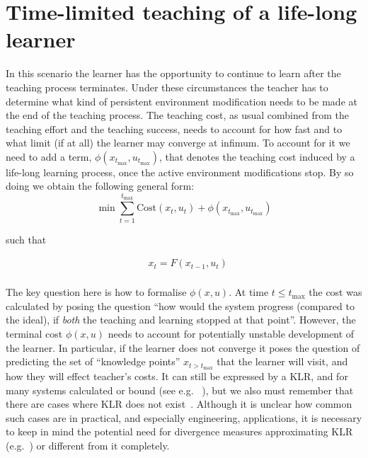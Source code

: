 \documentclass{article}
\newcommand{\ct}{\ensuremath{\mathrm{Cost}(x_t,u_t)}}
\begin{document}
\section*{Time-limited teaching of a life-long learner}

In this scenario the learner has the opportunity to continue to learn
after the teaching process terminates. Under these circumstances the
teacher has to determine what kind of persistent environment
modification needs to be made at the end of the teaching process. The
teaching cost, as usual combined from the teaching effort and the
teaching success, needs to account for how fast and to what limit (if
at all) the learner may converge at infimum. To account for it we need to add a term, $\phi(x_{t_{\max}}, u_{t_{\max}})$, that denotes the teaching cost induced by a life-long learning process, once the active environment modifications stop. By so doing we obtain the following general form:
\[
\min \sum\limits_{t=1}^{t_{\max}}\ct + \phi(x_{t_{\max}}, u_{t_{\max}})
\]
\centerline{such that}
\begin{eqnarray*}
&x_t=F(x_{t-1},u_t)\\
\end{eqnarray*}

The key question here is how to formalise $\phi(x,u)$. At time $t\leq
t_{\max}$ the cost was calculated by posing the question ``how would
the system progress (compared to the ideal), if {\em both} the
teaching and learning stopped at that point''. However, the terminal
cost $\phi(x,u)$ needs to account for potentially unstable development
of the learner. In particular, if the learner does not converge it
poses the question of predicting the set of ``knowledge points''
$x_{t>t_{\max}}$ that the learner will visit, and how they will effect
teacher's costs. It can still be expressed by a KLR, and for many
systems calculated or bound (see
e.g. ~\cite{sun_mehta_2010,do_2003,zuk_2006,vidyasagar_2007}), but we
also must remember that there are cases where KLR does not
exist~\cite{shields_93}. Although it is unclear how common such cases
are in practical, and especially engineering, applications, it is
necessary to keep in mind the potential need for divergence measures
approximating KLR (e.g.~\cite{rached_alajaji_campbell_2001}) or
different from it completely.
\end{document}
